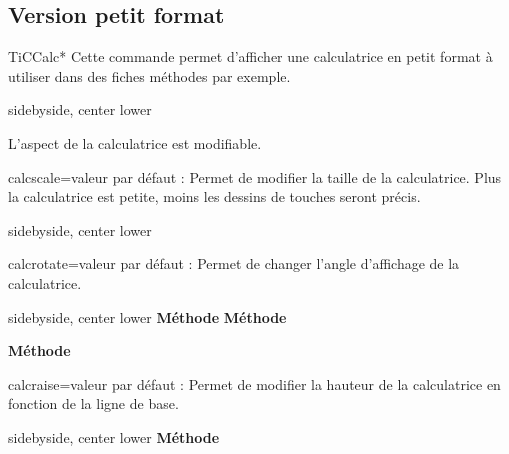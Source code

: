\documentclass[10pt,french,a4paper]{article}
\begin{document}
\begin{center}
\TiCCalc[title=Structure, colour calc=brown!20]
\end{center}

\subsection{Version petit format}

\begin{docCommand}{TiCCalc*}{}
    Cette commande permet d'afficher une calculatrice en petit format à utiliser dans des fiches méthodes par exemple.
\end{docCommand}

\begin{dispExample*}{sidebyside, center lower}
\TiCCalc*
\end{dispExample*}

L'aspect de la calculatrice est modifiable.

\begin{docKey}{calcscale}{=}{valeur par défaut : }
Permet de modifier la taille de la calculatrice. Plus la calculatrice est petite, moins les dessins de touches seront précis.
\end{docKey}

\begin{dispExample*}{sidebyside, center lower}
\TiCCalc*[calcscale=1]
\TiCCalc*[calcscale=0.25]
\end{dispExample*}

\begin{docKey}{calcrotate}{=}{valeur par défaut : }
Permet de changer l'angle d'affichage de la calculatrice.
\end{docKey}

\begin{dispExample*}{sidebyside, center lower}
\TiCCalc*[calcrotate=0] \textbf{Méthode}
\qquad
\TiCCalc*[calcrotate=90] \textbf{Méthode}
\par\bigskip
\TiCCalc*[calcrotate=-30]
\hspace{-1em}\textbf{Méthode}
\qquad
{}
\TiCCalc*[calcrotate=0]
\end{dispExample*}

\begin{docKey}{calcraise}{=}{valeur par défaut : \docValue{-2ex}}
Permet de modifier la hauteur de la calculatrice en fonction de la ligne de base.
\end{docKey}

\begin{dispExample*}{sidebyside, center lower}
\TiCCalc*[calcrotate=0, calcraise=0ex] \textbf{Méthode}
\qquad
{}
\TiCCalc*[calcrotate=0, calcraise=1ex]
\end{dispExample*}


\clearpage

\printindex
\end{document}

